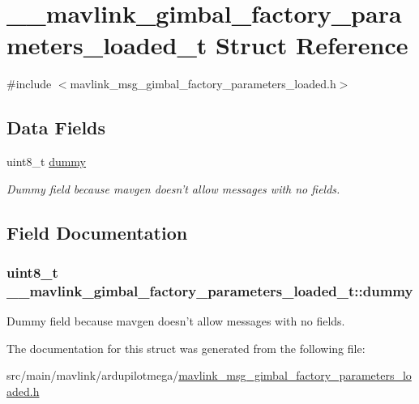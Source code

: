 \hypertarget{struct____mavlink__gimbal__factory__parameters__loaded__t}{\section{\+\_\+\+\_\+mavlink\+\_\+gimbal\+\_\+factory\+\_\+parameters\+\_\+loaded\+\_\+t Struct Reference}
\label{struct____mavlink__gimbal__factory__parameters__loaded__t}
}


{\ttfamily \#include $<$mavlink\+\_\+msg\+\_\+gimbal\+\_\+factory\+\_\+parameters\+\_\+loaded.\+h$>$}

\subsection*{Data Fields}
\begin{DoxyCompactItemize}
\item 
uint8\+\_\+t \hyperlink{struct____mavlink__gimbal__factory__parameters__loaded__t_a90b59e8d6d32b9347627b142c0515d75}{dummy}
\begin{DoxyCompactList}\small\item\em Dummy field because mavgen doesn't allow messages with no fields. \end{DoxyCompactList}\end{DoxyCompactItemize}


\subsection{Field Documentation}
\hypertarget{struct____mavlink__gimbal__factory__parameters__loaded__t_a90b59e8d6d32b9347627b142c0515d75}{
\subsubsection[{dummy}]{\setlength{\rightskip}{0pt plus 5cm}uint8\+\_\+t \+\_\+\+\_\+mavlink\+\_\+gimbal\+\_\+factory\+\_\+parameters\+\_\+loaded\+\_\+t\+::dummy}}\label{struct____mavlink__gimbal__factory__parameters__loaded__t_a90b59e8d6d32b9347627b142c0515d75}


Dummy field because mavgen doesn't allow messages with no fields. 



The documentation for this struct was generated from the following file\+:\begin{DoxyCompactItemize}
\item 
src/main/mavlink/ardupilotmega/\hyperlink{mavlink__msg__gimbal__factory__parameters__loaded_8h}{mavlink\+\_\+msg\+\_\+gimbal\+\_\+factory\+\_\+parameters\+\_\+loaded.\+h}\end{DoxyCompactItemize}
